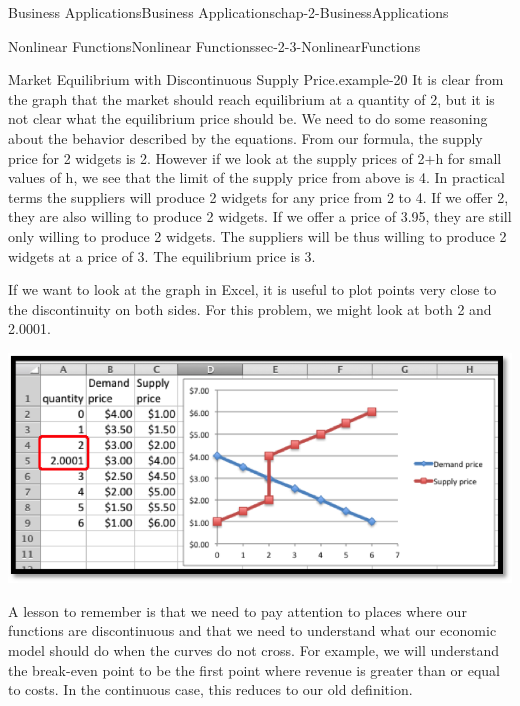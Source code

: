 \documentclass[oneside,10pt,]{book}
\numberwithin{equation}{section}
\begin{document}
\begin{chapterptx}{Business Applications}{}{Business Applications}{}{}{chap-2-BusinessApplications}
\begin{sectionptx}{Nonlinear Functions}{}{Nonlinear Functions}{}{}{sec-2-3-NonlinearFunctions}
\begin{example}{Market Equilibrium with Discontinuous Supply Price.}{example-20}
It is clear from the graph that the market should reach equilibrium at a quantity of 2, but it is not clear what the equilibrium price should be.  We need to do some reasoning about the behavior described by the equations.  From our formula, the supply price for 2 widgets is \textdollar{}2.  However if we look at the supply prices of 2+h for small values of h, we see that the limit of the supply price from above is \textdollar{}4.  In practical terms the suppliers will produce 2 widgets for any price from \textdollar{}2 to \textdollar{}4.  If we offer \textdollar{}2, they are also willing to produce 2 widgets.  If we offer a price of \textdollar{}3.95, they are still only willing to produce 2 widgets.  The suppliers will be thus willing to produce 2 widgets at a price of \textdollar{}3.  The equilibrium price is 3.%
\par
\hypertarget{p-799}{}%
If we want to look at the graph in Excel, it is useful to plot points very close to the discontinuity on both sides.  For this problem, we might look at both 2 and 2.0001.%
\begin{sidebyside}{1}{0.1}{0.1}{0}%
\begin{sbspanel}{0.8}%
\includegraphics[width=1\linewidth]{images/sec2-3-10.png}
\end{sbspanel}%
\end{sidebyside}%
\end{example}
\hypertarget{p-800}{}%
A lesson to remember is that we need to pay attention to places where our functions are discontinuous and that we need to understand what our economic model should do when the curves do not cross.  For example, we will understand the break-even point to be the first point where revenue is greater than or equal to costs.  In the continuous case, this reduces to our old definition.%
%
%
\typeout{************************************************}
\typeout{************************************************}

\end{sectionptx}
\end{chapterptx}
\end{document}
